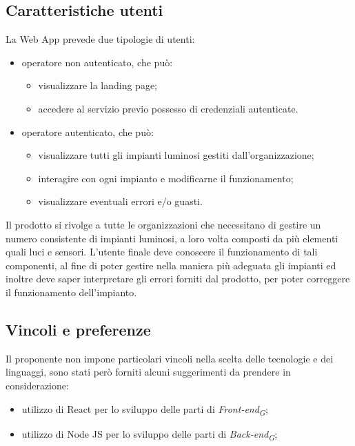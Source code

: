\documentclass[a4paper, 12pt]{article}
\begin{document}
\subsection{Caratteristiche utenti}
La Web App prevede due tipologie di utenti:
\begin{itemize}
    \item operatore non autenticato, che può: \begin{itemize}
        \item visualizzare la landing page;
        \item accedere al servizio previo possesso di credenziali autenticate.
    \end{itemize}
    \item operatore autenticato, che può: \begin{itemize}
        \item visualizzare tutti gli impianti luminosi gestiti dall'organizzazione;
        \item interagire con ogni impianto e modificarne il funzionamento;
        \item visualizzare eventuali errori e/o guasti.
    \end{itemize}
\end{itemize}
Il prodotto si rivolge a tutte le organizzazioni che necessitano di gestire un
numero consistente di impianti luminosi, a loro volta composti da più elementi
quali luci e sensori. L'utente finale deve conoscere il funzionamento di tali
componenti, al fine di poter gestire nella maniera più adeguata gli impianti ed
inoltre deve saper interpretare gli errori forniti dal prodotto, per poter
correggere il funzionamento dell'impianto.

\subsection{Vincoli e preferenze}
Il proponente non impone particolari vincoli nella scelta delle tecnologie e dei linguaggi, sono stati però forniti alcuni suggerimenti da prendere in considerazione:
\begin{itemize}
    \item utilizzo di React per lo sviluppo delle parti di \textit{Front-end\textsubscript{G}};
    \item utilizzo di Node JS per lo sviluppo delle parti di \textit{Back-end\textsubscript{G}};
\end{itemize}
\end{document}
